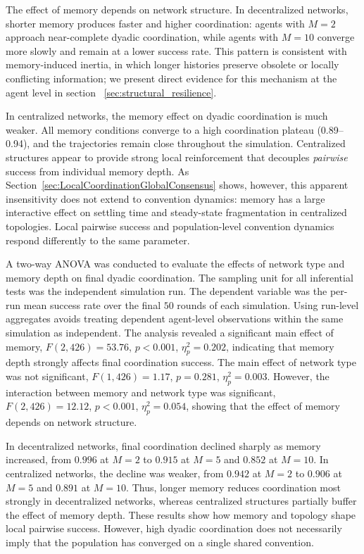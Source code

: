 \documentclass{article}
\begin{document}
The effect of memory depends on network structure. In decentralized networks, shorter memory produces faster and higher coordination: agents with $M=2$ approach near-complete dyadic coordination, while agents with $M=10$ converge more slowly and remain at a lower success rate. This pattern is consistent with memory-induced inertia, in which longer histories preserve obsolete or locally conflicting information; we present direct evidence for this mechanism at the agent level in section ~\ref{sec:structural_resilience}.

In centralized networks, the memory effect on dyadic coordination is much weaker. All memory conditions converge to a high coordination plateau (0.89--0.94), and the trajectories remain close throughout the simulation. Centralized structures appear to provide strong local reinforcement that decouples \emph{pairwise} success from individual memory depth. As Section~\ref{sec:LocalCoordinationGlobalConsensus} shows, however, this apparent insensitivity does not extend to convention dynamics: memory has a large interactive effect on settling time and steady-state fragmentation in centralized topologies. Local pairwise success and population-level convention dynamics respond differently to the same parameter.

A two-way ANOVA was conducted to evaluate the effects of network type and memory depth on final dyadic coordination. The sampling unit for all inferential tests was the independent simulation run. The dependent variable was the per-run mean success rate over the final $50$ rounds of each simulation. Using run-level aggregates avoids treating dependent agent-level observations within the same simulation as independent. The analysis revealed a significant main effect of memory, $F(2,426)=53.76$, $p<0.001$, $\eta_p^2=0.202$, indicating that memory depth strongly affects final coordination success. The main effect of network type was not significant, $F(1,426)=1.17$, $p=0.281$, $\eta_p^2=0.003$. However, the interaction between memory and network type was significant, $F(2,426)=12.12$, $p<0.001$, $\eta_p^2=0.054$, showing that the effect of memory depends on network structure.

In decentralized networks, final coordination declined sharply as memory increased, from $0.996$ at $M=2$ to $0.915$ at $M=5$ and $0.852$ at $M=10$. In centralized networks, the decline was weaker, from $0.942$ at $M=2$ to $0.906$ at $M=5$ and $0.891$ at $M=10$. Thus, longer memory reduces coordination most strongly in decentralized networks, whereas centralized structures partially buffer the effect of memory depth. These results show how memory and topology shape local pairwise success. However, high dyadic coordination does not necessarily imply that the population has converged on a single shared convention.
\end{document}
